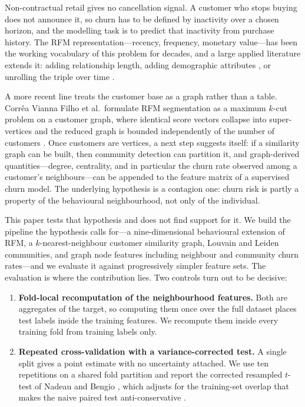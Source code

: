 \documentclass[runningheads]{llncs}
\begin{document}
Non-contractual retail gives no cancellation signal. A customer who stops buying
does not announce it, so churn has to be defined by inactivity over a chosen
horizon, and the modelling task is to predict that inactivity from purchase
history. The RFM representation---recency, frequency, monetary value---has been
the working vocabulary of this problem for decades, and a large applied
literature extends it: adding relationship length, adding demographic attributes
\cite{ho2023extended}, or unrolling the triple over time
\cite{mena2023timevarying}.

A more recent line treats the customer base as a graph rather than a table.
Corr\^{e}a Vianna Filho et al.\ formulate RFM segmentation as a maximum $k$-cut
problem on a customer graph, where identical score vectors collapse into
super-vertices and the reduced graph is bounded independently of the number of
customers \cite{viannafilho2026rfm}. Once customers are vertices, a next step
suggests itself: if a similarity graph can be built, then community detection
\cite{blondel2008louvain,traag2019leiden} can partition it, and graph-derived
quantities---degree, centrality, and in particular the churn rate observed among
a customer's neighbours---can be appended to the feature matrix of a supervised
churn model. The underlying hypothesis is a contagion one: churn risk is partly a
property of the behavioural neighbourhood, not only of the individual.

This paper tests that hypothesis and does not find support for it. We build the
pipeline the hypothesis calls for---a nine-dimensional behavioural extension of
RFM, a $k$-nearest-neighbour customer similarity graph, Louvain and Leiden
communities, and graph node features including neighbour and community churn
rates---and we evaluate it against progressively simpler feature sets. The
evaluation is where the contribution lies. Two controls turn out to be decisive:

\begin{enumerate}
\item \textbf{Fold-local recomputation of the neighbourhood features.} Both are
aggregates of the target, so computing them once over the full dataset places
test labels inside the training features. We recompute them inside every training
fold from training labels only.
\item \textbf{Repeated cross-validation with a variance-corrected test.} A single
split gives a point estimate with no uncertainty attached. We use ten repetitions
on a shared fold partition and report the corrected resampled $t$-test of Nadeau
and Bengio \cite{nadeau2003inference}, which adjusts for the training-set overlap
that makes the naive paired test anti-conservative
\cite{dietterich1998approximate,bouckaert2004replicability}.
\end{enumerate}
\end{document}

